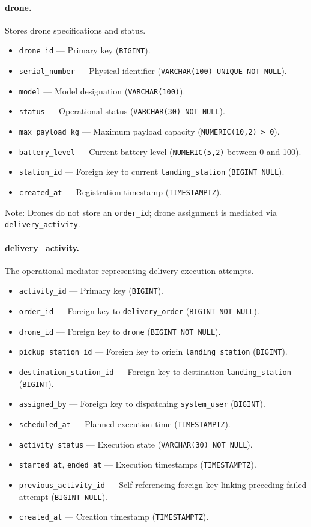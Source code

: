 \paragraph{drone.}
Stores drone specifications and status.
\begin{itemize}
    \item \texttt{drone\_id} — Primary key (\texttt{BIGINT}).
    \item \texttt{serial\_number} — Physical identifier (\texttt{VARCHAR(100) UNIQUE NOT NULL}).
    \item \texttt{model} — Model designation (\texttt{VARCHAR(100)}).
    \item \texttt{status} — Operational status (\texttt{VARCHAR(30) NOT NULL}).
    \item \texttt{max\_payload\_kg} — Maximum payload capacity (\texttt{NUMERIC(10,2) > 0}).
    \item \texttt{battery\_level} — Current battery level (\texttt{NUMERIC(5,2)} between 0 and 100).
    \item \texttt{station\_id} — Foreign key to current \texttt{landing\_station} (\texttt{BIGINT NULL}).
    \item \texttt{created\_at} — Registration timestamp (\texttt{TIMESTAMPTZ}).
\end{itemize}
Note: Drones do not store an \texttt{order\_id}; drone assignment is mediated via \texttt{delivery\_activity}.

\paragraph{delivery\_activity.}
The operational mediator representing delivery execution attempts.
\begin{itemize}
    \item \texttt{activity\_id} — Primary key (\texttt{BIGINT}).
    \item \texttt{order\_id} — Foreign key to \texttt{delivery\_order} (\texttt{BIGINT NOT NULL}).
    \item \texttt{drone\_id} — Foreign key to \texttt{drone} (\texttt{BIGINT NOT NULL}).
    \item \texttt{pickup\_station\_id} — Foreign key to origin \texttt{landing\_station} (\texttt{BIGINT}).
    \item \texttt{destination\_station\_id} — Foreign key to destination \texttt{landing\_station} (\texttt{BIGINT}).
    \item \texttt{assigned\_by} — Foreign key to dispatching \texttt{system\_user} (\texttt{BIGINT}).
    \item \texttt{scheduled\_at} — Planned execution time (\texttt{TIMESTAMPTZ}).
    \item \texttt{activity\_status} — Execution state (\texttt{VARCHAR(30) NOT NULL}).
    \item \texttt{started\_at}, \texttt{ended\_at} — Execution timestamps (\texttt{TIMESTAMPTZ}).
    \item \texttt{previous\_activity\_id} — Self-referencing foreign key linking preceding failed attempt (\texttt{BIGINT NULL}).
    \item \texttt{created\_at} — Creation timestamp (\texttt{TIMESTAMPTZ}).
\end{itemize}

